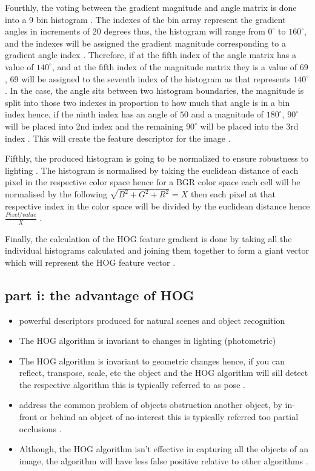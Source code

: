 \documentclass[conference]{IEEEtran}
\begin{document}
Fourthly, the voting between the gradient magnitude and angle matrix is done into a 9 bin histogram \cite{b12}. The indexes of the bin array represent the gradient angles in increments of 20 degrees thus, the histogram will range from $0^{\circ}$ to $160^{\circ}$, and the indexes will be assigned the gradient magnitude corresponding to a gradient angle index \cite{b12} \cite{b11}. Therefore, if at the fifth index of the angle matrix has a value of $140^{\circ}$, and at the fifth index of the magnitude matrix they is a value of $69$, 69 will be assigned to the seventh index of the histogram as that represents $140^{\circ}$ \cite{b11} \cite{b12}. In the case, the angle sits between two histogram boundaries, the magnitude is split into those two indexes in proportion to how much that angle is in a bin index hence, if the ninth index has an angle of $50$ and a magnitude of $180^{\circ}$, $90^{\circ}$ will be placed into 2nd index and the remaining $90^{\circ}$ will be placed into the 3rd index \cite{b12} \cite{b11}. This will create the feature descriptor for the image \cite{b12} \cite{b11}. \par

Fifthly, the produced histogram is going to be normalized to ensure robustness to lighting \cite{b11} \cite{b12}. The histogram is normalised by taking the euclidean distance of each pixel in the respective color space hence for a BGR color space each cell will be normalised by the following $\sqrt{B^{2} + G^{2} + R^{2}} = X $ then each pixel at that respective index in the color space will  be divided by the euclidean distance hence $\frac{Pixel/ value}{X}$ \cite{b12} \cite{b11}.\par

Finally, the calculation of the HOG feature gradient is done by taking all the individual histograms calculated and joining them together to form a giant vector which will represent the HOG feature vector \cite{b11} \cite{b12}.

\subsection{part i: the advantage of HOG}
\begin{itemize}
	\item powerful descriptors produced for natural scenes and object recognition \cite{b8}
	\item The HOG algorithm is invariant to changes in lighting (photometric) \cite{b8}
	\item The HOG algorithm is invariant to geometric changes hence, if you can reflect, transpose, scale, etc the object and the HOG algorithm will sill detect the respective algorithm	this is typically referred to as pose \cite{b8}.
	\item address the common problem of objects obstruction another object, by in-front or behind an object of no-interest this is typically referred too partial occlusions \cite{b8}.
	\item Although, the HOG algorithm isn't effective in capturing all the objects of an image, the algorithm will have less false positive relative to other algorithms \cite{b6}. 
\end{itemize}
\end{document}
